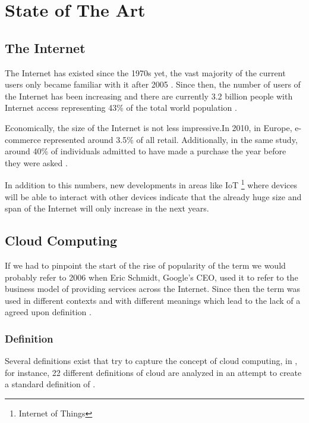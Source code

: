 \chapter{State of The Art} \label{chap:stateoftheart}
    \section{The Internet}

    The Internet has existed since the 1970s yet, the vast majority of the current users only became familiar with it after 2005 \cite{Guangming2011}. Since then, the number of users of the Internet has been increasing and there are currently 3.2 billion people with Internet access representing 43\% of the total world population \cite{SANOU2015}.

    Economically, the size of the Internet is not less impressive.In 2010, in Europe, e-commerce represented around 3.5\% of all retail. Additionally, in the same study, around 40\% of individuals admitted to have made a purchase the year before they were asked \cite{EuropeanCommission2012}.

    In addition to this numbers, new developments in areas like IoT \footnote{Internet of Things} where devices will be able to interact with other devices \cite{Suresh2014} indicate that the already huge size and span of the Internet will only increase in the next years.


    \section{Cloud Computing} \label{chap:stateoftheart:sec:cloud}
    	If we had to pinpoint the start of the rise of popularity of the term  we would probably refer to 2006 when Eric Schmidt, Google's CEO, used it to refer to the business model of providing services across the Internet\cite{Zhang2010}.  Since then the term was used in different contexts and with different meanings which lead to the lack of a agreed upon definition \cite{Zhang2010}.
    
    
    	\subsection{Definition} \label{chap:stateoftheheart:sec:cloud:sec:definition}
        Several definitions exist that try to capture the concept of cloud computing, in  \cite{Vaquero2008}, for instance, 22 different definitions of cloud are analyzed in an attempt to create a standard definition of . 
        
